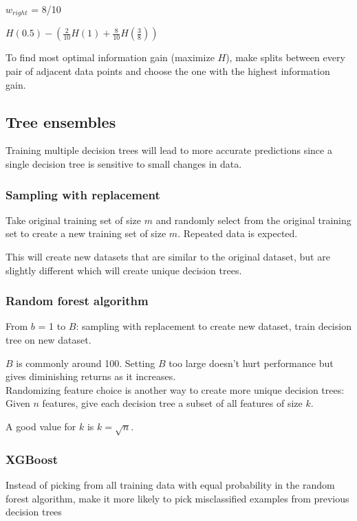 \documentclass[12pt]{article}
\begin{document}
$w_{right}$ = 8/10

$H(0.5) - (\frac{2}{10} H(1) + \frac{8}{10} H(\frac{3}{8}))$

To find most optimal information gain (maximize $H$), make splits between every pair of adjacent data points and choose
the one with the highest information gain.

\subsection{Tree ensembles}

Training multiple decision trees will lead to more accurate predictions since
a single decision tree is sensitive to small changes in data.

\subsubsection{Sampling with replacement}

Take original training set of size $m$ and randomly select from the original training set to
create a new training set of size $m$. Repeated data is expected.

This will create new datasets that are similar to the original dataset, but are slightly different
which will create unique decision trees.

\subsubsection{Random forest algorithm}

From $b$ = 1 to $B$: sampling with replacement to create new dataset, train decision tree on new dataset.

$B$ is commonly around 100. Setting $B$ too large doesn't hurt performance but gives diminishing returns
as it increases.\\

Randomizing feature choice is another way to create more unique decision trees:
Given $n$ features, give each decision tree a subset of all features of size $k$.

A good value for $k$ is $k = \sqrt n$.

\subsubsection{XGBoost}

Instead of picking from all training data with equal probability in the random forest algorithm,
make it more likely to pick misclassified examples from previous decision trees
\end{document}
